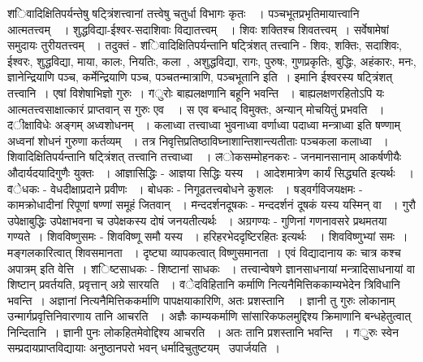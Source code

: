 {\fontsize{14}{16}\selectfont \v   शिवादिक्षितिपर्यन्तेषु षट्त्रिंशत्त्वानां तत्त्वेषु चतुर्धा विभागः कृतः~~। पञ्चभूतप्रभृतिमायात्त्वानि आत्मतत्त्वम्~~। शुद्धविद्या-ईश्वर-सदाशिवाः विद्यातत्त्वम्~~। शिवः शक्तिश्च शिवतत्त्वम्~। सर्वेषामेषां समुदायः तुरीयतत्त्वम् ~। तदुक्तं - 
{\fontsize{14}{16}\selectfont \v  शिवादिक्षितिपर्यन्तानि षट्त्रिंशत् तत्त्वानि - शिवः, शक्तिः, सदाशिवः, ईश्वरः, शुद्धविद्या, माया, कालः, नियतिः, कला~, अशुद्धविद्या, रागः, पुरुषः, गुणप्रकृतिः, बुद्धिः, अहंकारः, मनः, ज्ञानेन्द्रियाणि पञ्च, कर्मेन्द्रियाणि पञ्च,  पञ्चतन्मात्राणि, पञ्चभूतानि इति~। इमानि ईश्वरस्य षट्त्रिंशत् तत्त्वानि~। एषां विशेषाभिज्ञो गुरुः~।}
{\fontsize{14}{16}\selectfont \v  गुरोः बाह्यलक्षणानि बहूनि भवन्ति ~। बाह्यलक्षणरहितोऽपि यः आत्मतत्त्वसाक्षात्कारं प्राप्तवान् स गुरुः एव~~। स एव बन्धाद् विमुक्तः, अन्यान् मोचयितुं प्रभवति ~।}
{\fontsize{14}{16}\selectfont \v  दीक्षाविधेः अङ्गम् अध्वशोधनम् ~। कलाध्वा तत्त्वाध्वा भुवनाध्वा वर्णाध्वा पदाध्वा मन्त्राध्वा इति षण्णाम् अध्वनां शोधनं गुरुणा कर्तव्यम् ~। तत्र निवृत्तिप्रतिष्ठाविघ्नाशान्तिशान्त्यतीताः पञ्चकला \hfil कलाध्वा ~। शिवादिक्षितिपर्यन्तानि षट्त्रिंशत् तत्त्वानि \hfil तत्त्वाध्वा~~।
{\fontsize{14}{16}\selectfont \v  लोकसम्मोहनकरः - जनमानसानाम् आकर्षणीयैः औदार्यदयादिगुणैः युक्तः ~।}
{\fontsize{14}{16}\selectfont \v  आज्ञासिद्धिः - आज्ञया सिद्धिः यस्य ~। आदेशमात्रेण कार्यं सिद्ध्यति इत्यर्थः~~।}
{\fontsize{14}{16}\selectfont \v  वेधकः - वेधदीक्षाप्रदाने प्रवीणः ~। बोधकः - निगूढतत्त्वबोधने कुशलः ~। षड्वर्गविजयक्षमः - कामक्रोधादीनां रिपूणां षण्णां समूहं जितवान् ~।}
{\fontsize{14}{16}\selectfont \v  मन्ददर्शनदूषकः - मन्ददर्शनं दूषकं यस्य यस्मिन् वा ~। गुरौ उपेक्षाबुद्धिः उपेक्षाभवना च उपेक्षकस्य दोषं जनयतीत्यर्थः ~। अग्रगण्यः - गुणिनां गणनावसरे प्रथमतया गण्यते~। शिवविष्णुसमः - शिवविष्णू समौ यस्य ~। हरिहरभेददृष्टिरहितः इत्यर्थः~~। शिवविष्णुभ्यां समः~। मङ्गलकारित्वात् शिवसमानता ~। दृष्ट्या व्यापकत्वात् विष्णुसमानता~। एवं विद्यादानाय कः चात्र  कश्च अपात्रम् इति वेत्ति~।}
{\fontsize{14}{16}\selectfont \v  शिष्टसाधकः  - शिष्टानां साधकः ~। तत्त्वान्वेषणे ज्ञानसाधनायां मन्त्रादिसाधनायां वा शिष्टान् प्रवर्तयति, प्रवृत्तान् अग्रे सारयति ~।
{\fontsize{14}{16}\selectfont \v  वेदविहितानि कर्माणि नित्यनैमित्तिककाम्यभेदेन त्रिविधानि भवन्ति~। अज्ञानां  नित्यनैमित्तिककर्माणि पापक्षयाकारिणि, अतः प्रशस्तानि~~। ज्ञानी तु गुरुः लोकानाम् उन्मार्गप्रवृत्तिनिवारणाय तानि आचरति ~। अज्ञैः काम्यकर्माणि सांसारिकफलमुद्दिश्य क्रिमाणानि बन्धहेतुत्वात् निन्दितानि~। ज्ञानी पुनः लोकहितमेवोद्दिश्य आचरति ~। अतः तानि प्रशस्तानि भवन्ति ~।}
{\fontsize{14}{16}\selectfont \v    गुरुः स्वेन सम्प्रदायप्राप्तविद्यायाः अनुष्ठानपरो भवन् धर्मादिचुतुष्टयम् \footB \  उपार्जयति~।}
}}}
